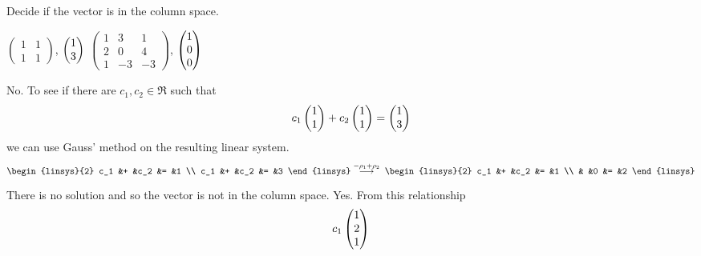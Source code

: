 \begin{exercises}
  \recommended \item 
    Decide if the vector is in the column space.
    \begin{exparts*}
      \partsitem \( \begin{pmatrix}
                 1  &1  \\
                 1  &1
               \end{pmatrix}  \),
            \( \begin{pmatrix} 1 \\ 3 \end{pmatrix} \)
      \partsitem \( \begin{pmatrix}
                 1  &3  &1 \\
                 2  &0  &4 \\
                 1  &-3 &-3
               \end{pmatrix}  \),
            \( \begin{pmatrix} 1 \\ 0 \\ 0 \end{pmatrix} \)
    \end{exparts*}
    \begin{answer}
       \begin{exparts}
          \partsitem No.
            To see if there are \( c_1,c_2\in\Re \) such that
            \begin{equation*}
              c_1\begin{pmatrix} 1 \\ 1 \end{pmatrix}
              +c_2\begin{pmatrix} 1 \\ 1 \end{pmatrix}
              =\begin{pmatrix} 1 \\ 3 \end{pmatrix}
            \end{equation*}
            we can use Gauss' method on the resulting linear system.
            \begin{equation*}
              \begin{linsys}{2}
                 c_1  &+  &c_2  &=  &1  \\
                 c_1  &+  &c_2  &=  &3  
              \end{linsys}
              \grstep{-\rho_1+\rho_2}
              \;\begin{linsys}{2}
                 c_1  &+  &c_2  &=  &1  \\
                      &   &0    &=  &2  
              \end{linsys}
            \end{equation*}
            There is no solution and so the vector is not in the column space.
          \partsitem Yes.
            From this relationship
            \begin{equation*}
              c_1\colvec{1 \\ 2 \\ 1}

\end{equation*}
\end{exparts}
\end{answer}
\end{exercises}

